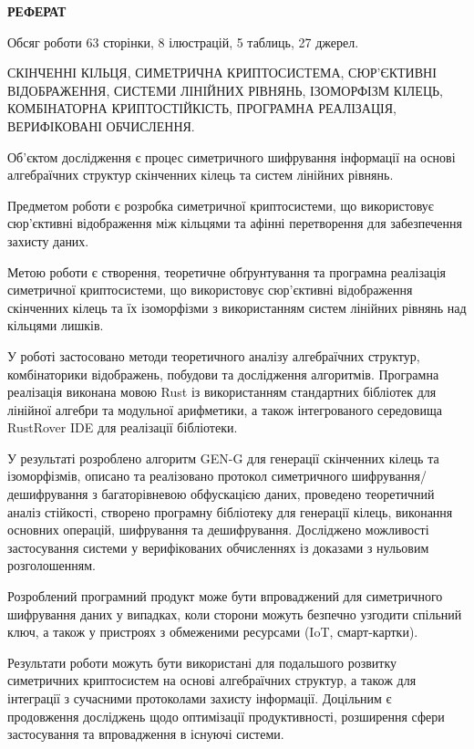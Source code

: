\begin{center}
    \textbf{РЕФЕРАТ}
\end{center}

Обсяг роботи 63 сторінки, 8 ілюстрацій, 5 таблиць, 27 джерел.

СКІНЧЕННІ КІЛЬЦЯ, СИМЕТРИЧНА КРИПТОСИСТЕМА, СЮР’ЄКТИВНІ ВІДОБРАЖЕННЯ, СИСТЕМИ ЛІНІЙНИХ РІВНЯНЬ, ІЗОМОРФІЗМ КІЛЕЦЬ,
КОМБІНАТОРНА КРИПТОСТІЙКІСТЬ, ПРОГРАМНА РЕАЛІЗАЦІЯ, ВЕРИФІКОВАНІ ОБЧИСЛЕННЯ.

Об’єктом дослідження є процес симетричного шифрування інформації на основі алгебраїчних структур скінченних кілець та систем лінійних рівнянь.

Предметом роботи є розробка симетричної криптосистеми, що використовує сюр’єктивні відображення між кільцями та афінні
перетворення для забезпечення захисту даних.

Метою роботи є створення, теоретичне обґрунтування та програмна реалізація симетричної криптосистеми, що використовує
сюр'єктивні відображення скінченних кілець та їх ізоморфізми з використанням систем лінійних рівнянь над кільцями лишків.

У роботі застосовано методи теоретичного аналізу алгебраїчних структур, комбінаторики відображень, побудови та дослідження алгоритмів.
Програмна реалізація виконана мовою Rust із використанням стандартних бібліотек для лінійної алгебри та модульної арифметики,
а також інтегрованого середовища RustRover IDE для реалізації бібліотеки.

У результаті розроблено алгоритм GEN-G для генерації скінченних кілець та ізоморфізмів, описано та реалізовано протокол
симетричного шифрування/дешифрування з багаторівневою обфускацією даних, проведено теоретичний аналіз стійкості, створено
програмну бібліотеку для генерації кілець, виконання основних операцій, шифрування та дешифрування.
Досліджено можливості застосування системи у верифікованих обчисленнях із доказами з нульовим розголошенням.

Розроблений програмний продукт може бути впроваджений для симетричного шифрування даних у випадках, коли сторони можуть
безпечно узгодити спільний ключ, а також у пристроях з обмеженими ресурсами (IoT, смарт-картки).

Результати роботи можуть бути використані для подальшого розвитку симетричних криптосистем на основі алгебраїчних структур,
а також для інтеграції з сучасними протоколами захисту інформації.
Доцільним є продовження досліджень щодо оптимізації продуктивності, розширення сфери застосування та впровадження в існуючі системи.